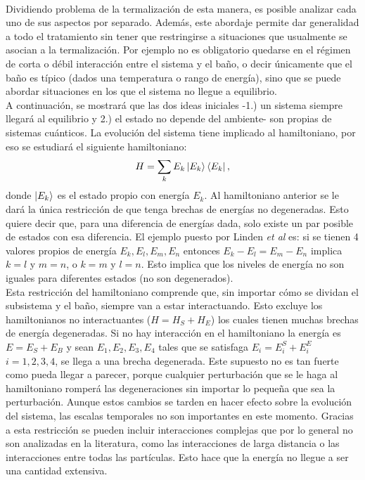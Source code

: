 \\
Dividiendo problema de la termalización de esta manera, es posible analizar cada uno de sus aspectos por separado. Además, este abordaje permite dar generalidad a todo el tratamiento sin tener que restringirse a situaciones que usualmente se asocian a la termalización. Por ejemplo no es obligatorio quedarse en el régimen de corta o débil interacción entre el sistema y el baño, o decir únicamente que el baño es típico (dados una temperatura o rango de energía), sino que se puede abordar situaciones en los que el sistema no llegue a equilibrio. 
\\
A continuación, se mostrará que las dos ideas iniciales -1.) un sistema siempre llegará al equilibrio y 2.) el estado no depende del ambiente- son propias de sistemas cuánticos. La evolución del sistema tiene implicado al hamiltoniano, por eso se estudiará el siguiente hamiltoniano:
\begin{equation}
H= \sum_{k} E_{k} \ket{E_{k}} \bra{E_{k}},
\end{equation}
donde $\ket{E_{k}}$ es el estado propio con energía $E_{k}$. Al hamiltoniano anterior se le dará la única restricción de que tenga brechas de energías no degeneradas. Esto quiere decir que, para una diferencia de energías dada, solo existe un par posible de estados con esa diferencia. El ejemplo puesto por Linden \textit{et al} \cite{LindenPaper} es: si se tienen 4 valores propios de energía $E_{k}, E_{l},E_{m},E_{n}$ entonces $E_{k}-E_{l}=E_{m}-E_{n} $ implica $k=l$ y $m=n$, o $k=m$ y $l=n$. Esto implica que los niveles de energía no son iguales para diferentes estados (no son degenerados).\\
Esta restricción del hamiltoniano comprende que, sin importar cómo se dividan el subsistema y el baño, siempre van a estar interactuando. Esto excluye los hamiltonianos no interactuantes ($H=H_{S}+H_{E}$) los cuales tienen muchas brechas de energía degeneradas. Si no hay interacción en el hamiltoniano la energía es $E=E_{S}+E_{B}$ y sean $E_{1},E_{2},E_{3},E_{4}$ tales que se satisfaga $E_{i}=E_{i}^{S}+E_{i}^{E}$ $i=1,2,3,4$, se llega a una brecha degenerada. Este supuesto no es tan fuerte como pueda llegar a parecer, porque cualquier perturbación que se le haga al hamiltoniano romperá las degeneraciones sin importar lo pequeña que sea la perturbación. Aunque estos cambios se tarden en hacer efecto sobre la evolución del sistema, las escalas temporales no son importantes en este momento.  Gracias a esta restricción se pueden incluir interacciones complejas que por lo general no son analizadas en la literatura, como las interacciones de larga distancia o las interacciones entre todas las partículas. Esto hace que la energía no llegue a ser una cantidad extensiva.

